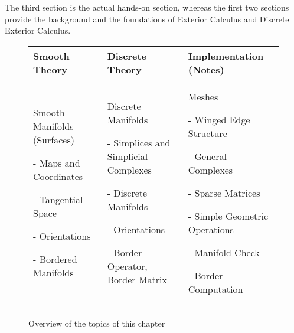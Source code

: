 The third section is the actual hands-on section, whereas the first two sections provide the background and the foundations of Exterior Calculus and Discrete Exterior Calculus.
\begin{figure}[ht]
\begin{center}
	\begin{longtable}{|p{4cm}|p{4cm}|p{4cm}|}
		\hline
		Smooth Theory& Discrete Theory& Implementation (Notes)\\
		\hline
		Smooth Manifolds (Surfaces)
		\begin{packed_itemize}
		\item[-] Maps and Coordinates
		\item[-] Tangential Space
		\item[-] Orientations
		\item[-] Bordered Manifolds
		\end{packed_itemize}
		&
		Discrete Manifolds
		\begin{packed_itemize}
		\item[-] Simplices and Simplicial Complexes
		\item[-] Discrete Manifolds
		\item[-] Orientations
		\item[-] Border Operator, Border Matrix
		\end{packed_itemize}
		&
		Meshes
		\begin{packed_itemize}
		\item[-] Winged Edge Structure
		\item[-] General Complexes
		\item[-] Sparse Matrices
		\item[-] Simple Geometric Operations
			\begin{packed_itemize}
				\item[-] Manifold Check
				\item[-] Border Computation
			\end{packed_itemize}
		\end{packed_itemize} \\
		\hline
	\end{longtable}
	\caption{Overview of the topics of this chapter}
\end{center}
\end{figure}

